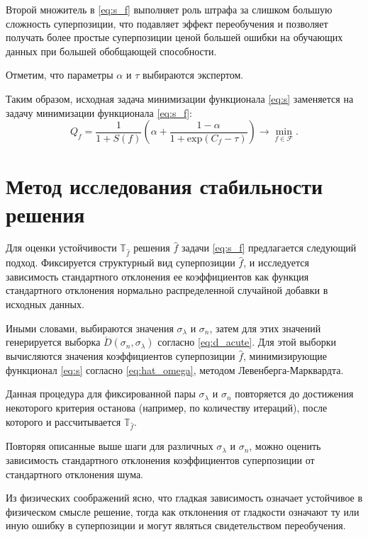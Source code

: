\documentclass[12pt,a4paper]{article}
\theoremstyle{definition}
\begin{document}
Второй множитель в \eqref{eq:s_f} выполняет роль штрафа за слишком
большую сложность суперпозиции, что подавляет эффект переобучения и позволяет
получать более простые суперпозиции ценой большей ошибки на обучающих данных
при большей обобщающей способности.

Отметим, что параметры $\alpha$ и $\tau$ выбираются экспертом.

Таким образом, исходная задача минимизации функционала \eqref{eq:s} заменяется
на задачу минимизации функционала \eqref{eq:s_f}:
\begin{equation}
  Q_f = \frac{1}{1 + S(f)} \left(\alpha + \frac{1 - \alpha}{1 + \text{exp} (C_f - \tau)}\right) \rightarrow \min_{f \in \mathcal{F}}.
  \label{eq:s_f_min}
\end{equation}

\section{Метод исследования стабильности решения}

Для оценки устойчивости $\mathbb{T}_{\hat{f}}$ решения $\hat{f}$ задачи
\eqref{eq:s_f} предлагается следующий подход. Фиксируется структурный вид суперпозиции
$\hat{f}$, и исследуется зависимость стандартного отклонения ее коэффициентов
как функция стандартного отклонения нормально распределенной случайной добавки
в исходных данных.

Иными словами, выбираются значения $\sigma_{\lambda}$ и $\sigma_n$, затем для этих
значений генерируется выборка $\acute{D}(\sigma_n, \sigma_{\lambda})$ согласно
\eqref{eq:d_acute}. Для этой выборки вычисляются значения коэффициентов суперпозиции
$\hat{f}$, минимизирующие функционал \eqref{eq:s} согласно \eqref{eq:hat_omega},
методом Левенберга-Марквардта.

Данная процедура для фиксированной пары $\sigma_{\lambda}$ и $\sigma_n$ повторяется
до достижения некоторого критерия останова (например, по количеству итераций),
после которого и рассчитывается $\mathbb{T}_{\hat{f}}$.

Повторяя описанные выше шаги для различных $\sigma_{\lambda}$ и $\sigma_n$, можно
оценить зависимость стандартного отклонения коэффициентов суперпозиции от
стандартного отклонения шума.

Из физических соображений ясно, что гладкая зависимость означает устойчивое в
физическом смысле решение, тогда как отклонения от гладкости означают
ту или иную ошибку в суперпозиции и могут являться свидетельством переобучения.
\end{document}
